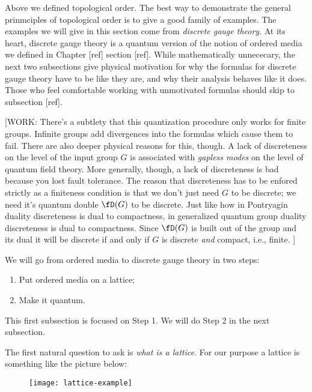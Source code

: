 Above we defined topological order. The best way to demonstrate the general prinmciples of topological order is to give a good family of examples. The examples we will give in this section come from \textit{discrete gauge theory}. At its heart, discrete gauge theory is a quantum version of the notion of ordered media we defined in Chapter [ref] section [ref]. While mathematically unnececary, the next two subsections give physical motivation for why the formulas for discrete gauge theory have to be like they are, and why their analysis behaves like it does. Those who feel comfortable working with unmotivated formulas should skip to subsection [ref].

[WORK: There's a subtlety that this quantization procedure only works for finite groups. Infinite groups add divergences into the formulas which cause them to fail. There are also deeper physical reasons for this, though. A lack of discreteness on the level of the input group $G$ is associated with \textit{gapless modes} on the level of quantum field theory\cite{hofman2019goldstone}. More generally, though, a lack of discreteness is bad because you lost fault tolerance. The reason that discreteness has to be enfored strictly as a finiteness condition is that we don't just need $G$ to be discrete; we need it's quantum double $\fD(G)$ to be discrete. Just like how in Pontryagin duality discreteness is dual to compactness, in generalized quantum group duality discreteness is dual to compactness. Since $\fD(G)$ is built out of the group and its dual it will be discrete if and only if $G$ is discrete \textit{and} compact, i.e., finite. \cite{van1998algebraic}]

We will go from ordered media to discrete gauge theory in two steps:

\begin{enumerate}[Step 1:]
\item Put ordered media on a lattice;
\item Make it quantum.
\end{enumerate}

This first subsection is focused on Step 1. We will do Step 2 in the next subsection.

The first natural question to ask is \textit{what is a lattice}. For our purpose a lattice is something like the picture below:

\begin{figure}[h]
\begin{center}
\texttt{[image: lattice-example]}
\end{center}
\end{figure}

